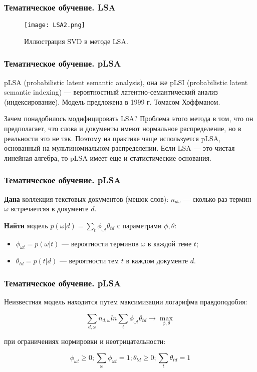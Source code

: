 \documentclass[notheorems, handout]{beamer}
\begin{document}
			\begin{frame}
	\frametitle{Тематическое обучение. LSA}
	

\begin{figure}[H]
	\begin{center}
		\texttt{[image: LSA2.png]}
		\caption{Иллюстрация SVD в методе LSA.}
	\end{center}
\end{figure}

	\end{frame}
		\begin{frame}
	\frametitle{Тематическое обучение. pLSA}
	

pLSA (probabilistic latent semantic analysis), она же pLSI (probabilistic latent semantic indexing) --- вероятностный латентно-семантический анализ (индексирование). Модель предложена в 1999 г. Томасом Хоффманом.

Зачем понадобилось модифицировать LSA? Проблема этого метода в том, что он предполагает, что слова и документы имеют нормальное распределение, но в реальности это не так. Поэтому на практике чаще используется pLSA, основанный на мультиномиальном распределении. Если LSA — это чистая линейная алгебра, то pLSA имеет еще и статистические основания.

	\end{frame}
	
			\begin{frame}
	\frametitle{Тематическое обучение. pLSA}
	

\textbf{Дана} коллекция текстовых документов (мешок слов): $n_{d\omega}$ --- сколько раз термин $\omega$ встречаетсяя в документе $d$.

\textbf{Найти} модель $p(\omega | d) = \sum_t \phi_{\omega t}\theta_{td}$ с параметрами $\phi, \theta$:

\begin{itemize}
	\item $\phi_{\omega t} = p(\omega | t)$  --- вероятности терминов $\omega$ в каждой теме $t$;
	\item $\theta_{td} = p(t | d)$ --- вероятности тем $t$ в каждом документе $d$.
\end{itemize}

	\end{frame}
	
	\begin{frame}
	\frametitle{Тематическое обучение. pLSA}
	

Неизвестная модель находится путем максимизации логарифма правдоподобия:

$$ \sum_{d,\omega} n_{d,\omega} ln \sum_{t} \phi_{\omega t}\theta_{td} \rightarrow  \max_{\phi, \theta}$$

при ограничениях нормировки и неотрицательности:

$$ \phi_{\omega t} \geq 0; \sum_{\omega} \phi_{\omega t} = 1; \theta_{td} \geq 0; \sum_{t} \theta_{td} = 1$$

	\end{frame}
	
\end{document}
